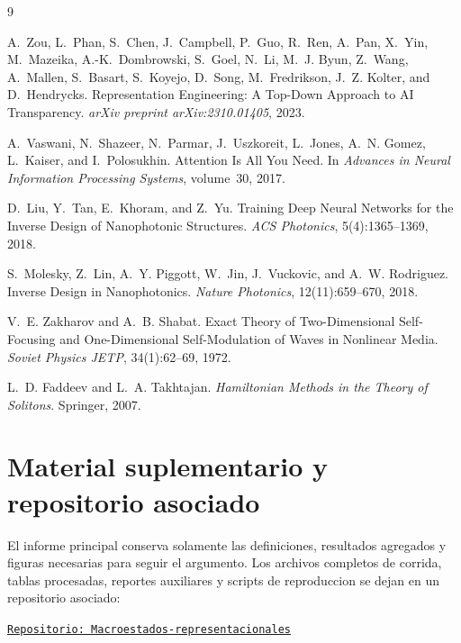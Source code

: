 \documentclass[10pt,twocolumn]{article}
\begin{document}
\clearpage
\begin{thebibliography}{9}
\footnotesize

A.~Zou, L.~Phan, S.~Chen, J.~Campbell, P.~Guo, R.~Ren, A.~Pan, X.~Yin, M.~Mazeika, A.-K.~Dombrowski, S.~Goel, N.~Li, M.~J. Byun, Z.~Wang, A.~Mallen, S.~Basart, S.~Koyejo, D.~Song, M.~Fredrikson, J.~Z. Kolter, and D.~Hendrycks.
\newblock Representation Engineering: A Top-Down Approach to AI Transparency.
\newblock \emph{arXiv preprint arXiv:2310.01405}, 2023.

A.~Vaswani, N.~Shazeer, N.~Parmar, J.~Uszkoreit, L.~Jones, A.~N. Gomez, L.~Kaiser, and I.~Polosukhin.
\newblock Attention Is All You Need.
\newblock In \emph{Advances in Neural Information Processing Systems}, volume~30, 2017.

D.~Liu, Y.~Tan, E.~Khoram, and Z.~Yu.
\newblock Training Deep Neural Networks for the Inverse Design of Nanophotonic Structures.
\newblock \emph{ACS Photonics}, 5(4):1365--1369, 2018.

S.~Molesky, Z.~Lin, A.~Y. Piggott, W.~Jin, J.~Vuckovic, and A.~W. Rodriguez.
\newblock Inverse Design in Nanophotonics.
\newblock \emph{Nature Photonics}, 12(11):659--670, 2018.

V.~E. Zakharov and A.~B. Shabat.
\newblock Exact Theory of Two-Dimensional Self-Focusing and One-Dimensional Self-Modulation of Waves in Nonlinear Media.
\newblock \emph{Soviet Physics JETP}, 34(1):62--69, 1972.

L.~D. Faddeev and L.~A. Takhtajan.
\newblock \emph{Hamiltonian Methods in the Theory of Solitons}.
\newblock Springer, 2007.

\end{thebibliography}


\appendix

\section{Material suplementario y repositorio asociado}
\label{app:repo}

El informe principal conserva solamente las definiciones, resultados agregados y figuras necesarias para seguir el argumento. Los archivos completos de corrida, tablas procesadas, reportes auxiliares y scripts de reproduccion se dejan en un repositorio asociado:

\begin{center}
\href{https://github.com/roldannahuelalejadro/Macroestados-representacionales}{\texttt{Repositorio: Macroestados-representacionales}}
\end{center}
\end{document}
